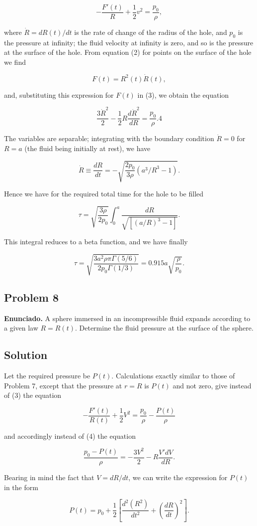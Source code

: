 \documentclass{article}
\begin{document}
$$
-\frac{F'(t)}{R} + \frac{1}{2} v^2 = \frac{p_0}{\rho}, \tag{3}
$$

where $\dot{R} = dR(t)/dt$ is the rate of change of the radius of the hole, and $p_0$ is the pressure at infinity; the fluid velocity at infinity is zero, and so is the pressure at the surface of the hole. From equation (2) for points on the surface of the hole we find

$$
F(t) = R^2(t) \dot{R}(t),
$$

and, substituting this expression for $F(t)$ in (3), we obtain the equation

$$
\frac{3\dot{R}^2}{2} - \frac{1}{2} R \frac{d\dot{R}^2}{dR} = \frac{p_0}{\rho}. {4}
$$

The variables are separable; integrating with the boundary condition $\dot{R} = 0$ for $R = a$ (the fluid being initially at rest), we have

$$
\dot{R} \equiv \frac{dR}{dt} = -\sqrt{\frac{2p_0}{3\rho} \left( a^3/R^3 - 1 \right)}.
$$

Hence we have for the required total time for the hole to be filled

$$
\tau = \sqrt{\frac{3\rho}{2p_0}} \int_0^a \frac{dR}{\sqrt{[(a/R)^3 - 1]}}.
$$

This integral reduces to a beta function, and we have finally

$$
\tau = \sqrt{\frac{3a^2 \rho \pi \Gamma(5/6)}{2p_0 \Gamma(1/3)}} = 0.915a \sqrt{\frac{\rho}{p_0}}.
$$

\subsection*{Problem 8}

\textbf{Enunciado.} A sphere immersed in an incompressible fluid expands according to a given law $R = R(t)$. Determine the fluid pressure at the surface of the sphere.

\subsection*{Solution}

Let the required pressure be $P(t)$. Calculations exactly similar to those of Problem 7, except that the pressure at $r = R$ is $P(t)$ and not zero, give instead of (3) the equation

$$
-\frac{F'(t)}{R(t)} + \frac{1}{2} V^2 = \frac{p_0}{\rho} - \frac{P(t)}{\rho}
$$

and accordingly instead of (4) the equation

$$
\frac{p_0 - P(t)}{\rho} = -\frac{3V^2}{2} - R \frac{V' dV}{dR}.
$$

Bearing in mind the fact that $V = dR/dt$, we can write the expression for $P(t)$ in the form

$$
P(t) = p_0 + \frac{1}{2} \left[ \frac{d^2(R^2)}{dt^2} + \left( \frac{dR}{dt} \right)^2 \right].
$$
\end{document}
